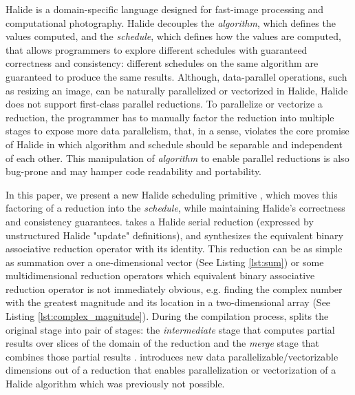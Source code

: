 Halide \cite{Ragan-Kelley:2013:HLC:2491956.2462176} is a domain-specific language designed for fast-image processing and computational photography. Halide decouples the \emph{algorithm}, which defines the values computed, and the \emph{schedule}, which defines how the values are computed, that allows programmers to explore different schedules with guaranteed correctness and consistency: different schedules on the same algorithm are guaranteed to produce the same results. Although, data-parallel operations, such as resizing an image, can be naturally parallelized or vectorized in Halide, Halide does not support first-class parallel reductions. To parallelize or vectorize a reduction, the programmer has to manually factor the reduction into multiple stages to expose more data parallelism, that, in a sense, violates the core promise of Halide in which algorithm and schedule should be separable and independent of each other. This manipulation of \emph{algorithm} to enable parallel reductions is also 
bug-prone and may hamper code readability and portability. 

In this paper, we present a new Halide scheduling primitive , which moves this factoring of a reduction into the \emph{schedule}, while maintaining Halide's correctness and consistency guarantees.  takes a Halide serial reduction (expressed by unstructured Halide "update" definitions), and synthesizes the equivalent binary associative reduction operator with its identity. This reduction can be as simple as summation over a one-dimensional vector (See Listing \ref{lst:sum}) or some multidimensional reduction operators which equivalent binary associative reduction operator is not immediately obvious, e.g. finding the complex number with the greatest magnitude and its location in a two-dimensional array (See Listing \ref{lst:complex_magnitude}). During the compilation process,  splits the original stage into pair of stages: the \emph{intermediate} stage that computes partial results over slices of the domain of the reduction and the \emph{merge} stage that combines those partial results .  introduces new data parallelizable/vectorizable dimensions out of a reduction that enables parallelization or vectorization of a Halide algorithm which was previously not possible. 

